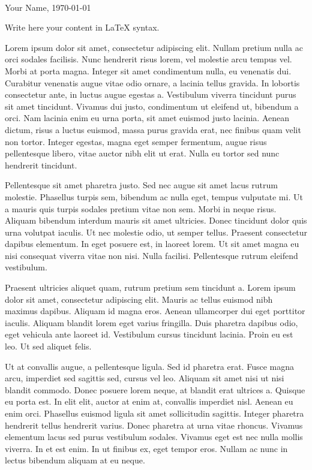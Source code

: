 \documentclass{article}
\begin{document}
 \\
Your Name, \today

\vspace{1cm}

Write here your content in LaTeX syntax.
\vspace{0.5cm}

Lorem ipsum dolor sit amet, consectetur adipiscing elit. Nullam pretium nulla ac orci sodales facilisis. Nunc hendrerit risus lorem, vel molestie arcu tempus vel. Morbi at porta magna. Integer sit amet condimentum nulla, eu venenatis dui. Curabitur venenatis augue vitae odio ornare, a lacinia tellus gravida. In lobortis consectetur ante, in luctus augue egestas a. Vestibulum viverra tincidunt purus sit amet tincidunt. Vivamus dui justo, condimentum ut eleifend ut, bibendum a orci. Nam lacinia enim eu urna porta, sit amet euismod justo lacinia. Aenean dictum, risus a luctus euismod, massa purus gravida erat, nec finibus quam velit non tortor. Integer egestas, magna eget semper fermentum, augue risus pellentesque libero, vitae auctor nibh elit ut erat. Nulla eu tortor sed nunc hendrerit tincidunt.
\vspace{0.5cm}

Pellentesque sit amet pharetra justo. Sed nec augue sit amet lacus rutrum molestie. Phasellus turpis sem, bibendum ac nulla eget, tempus vulputate mi. Ut a mauris quis turpis sodales pretium vitae non sem. Morbi in neque risus. Aliquam bibendum interdum mauris sit amet ultricies. Donec tincidunt dolor quis urna volutpat iaculis. Ut nec molestie odio, ut semper tellus. Praesent consectetur dapibus elementum. In eget posuere est, in laoreet lorem. Ut sit amet magna eu nisi consequat viverra vitae non nisi. Nulla facilisi. Pellentesque rutrum eleifend vestibulum.
\vspace{0.5cm}

Praesent ultricies aliquet quam, rutrum pretium sem tincidunt a. Lorem ipsum dolor sit amet, consectetur adipiscing elit. Mauris ac tellus euismod nibh maximus dapibus. Aliquam id magna eros. Aenean ullamcorper dui eget porttitor iaculis. Aliquam blandit lorem eget varius fringilla. Duis pharetra dapibus odio, eget vehicula ante laoreet id. Vestibulum cursus tincidunt lacinia. Proin eu est leo. Ut sed aliquet felis.

\vspace{0.5cm}
Ut at convallis augue, a pellentesque ligula. Sed id pharetra erat. Fusce magna arcu, imperdiet sed sagittis sed, cursus vel leo. Aliquam sit amet nisi ut nisi blandit commodo. Donec posuere lorem neque, at blandit erat ultrices a. Quisque eu porta est. In elit elit, auctor at enim at, convallis imperdiet nisl. Aenean eu enim orci. Phasellus euismod ligula sit amet sollicitudin sagittis. Integer pharetra hendrerit tellus hendrerit varius. Donec pharetra at urna vitae rhoncus. Vivamus elementum lacus sed purus vestibulum sodales. Vivamus eget est nec nulla mollis viverra. In et est enim. In ut finibus ex, eget tempor eros. Nullam ac nunc in lectus bibendum aliquam at eu neque.
\end{document}
